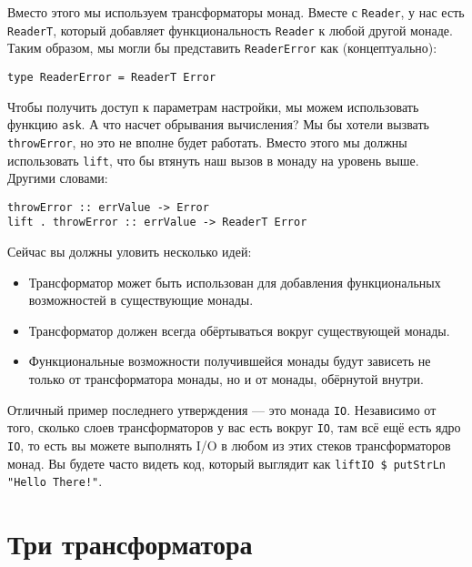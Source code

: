 Вместо этого мы используем трансформаторы монад. Вместе с \lstinline'Reader', у нас есть
\lstinline'ReaderT', который добавляет функциональность \lstinline'Reader' к любой другой
монаде. Таким образом, мы могли бы представить \lstinline'ReaderError' как
(концептуально):

\begin{lstlisting}
type ReaderError = ReaderT Error
\end{lstlisting}

Чтобы получить доступ к параметрам настройки, мы можем использовать функцию
\lstinline'ask'. А что насчет обрывания вычисления? Мы бы хотели вызвать
\lstinline'throwError', но это не вполне будет работать. Вместо этого мы должны
использовать \lstinline'lift', что бы втянуть наш вызов в монаду на уровень выше. Другими
словами:

\begin{lstlisting}
throwError :: errValue -> Error
lift . throwError :: errValue -> ReaderT Error
\end{lstlisting}
  
Сейчас вы должны уловить несколько идей:
\begin{itemize}
\item  Трансформатор может быть использован для добавления функциональных возможностей в
существующие монады.
\item  Трансформатор должен всегда обёртываться вокруг существующей монады.
\item  Функциональные возможности получившейся монады будут зависеть не только от
трансформатора монады, но и от монады, обёрнутой внутри.
\end{itemize}

Отличный пример последнего утверждения --- это монада \lstinline'IO'. Независимо от того,
сколько слоев трансформаторов у вас есть вокруг \lstinline'IO', там всё ещё есть ядро
\lstinline'IO', то есть вы можете выполнять I/O в любом из этих стеков трансформаторов
монад. Вы будете часто видеть код, который выглядит как 
\lstinline'liftIO $ putStrLn "Hello There!"'.

\section{Три трансформатора}

